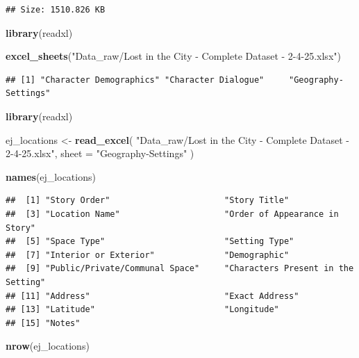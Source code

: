 \documentclass[
]{article}
\newenvironment{Shaded}{\begin{snugshade}}{\end{snugshade}}
\newcommand{\AttributeTok}[1]{\textcolor[rgb]{0.13,0.29,0.53}{#1}}
\newcommand{\FunctionTok}[1]{\textcolor[rgb]{0.13,0.29,0.53}{\textbf{#1}}}
\newcommand{\NormalTok}[1]{#1}
\newcommand{\OtherTok}[1]{\textcolor[rgb]{0.56,0.35,0.01}{#1}}
\newcommand{\StringTok}[1]{\textcolor[rgb]{0.31,0.60,0.02}{#1}}
\begin{document}
\begin{verbatim}
## Size: 1510.826 KB
\end{verbatim}

\begin{Shaded}
\begin{Highlighting}[]
\FunctionTok{library}\NormalTok{(readxl)}

\FunctionTok{excel\_sheets}\NormalTok{(}\StringTok{"Data\_raw/Lost in the City {-} Complete Dataset {-} 2{-}4{-}25.xlsx"}\NormalTok{)}
\end{Highlighting}
\end{Shaded}

\begin{verbatim}
## [1] "Character Demographics" "Character Dialogue"     "Geography-Settings"
\end{verbatim}

\begin{Shaded}
\begin{Highlighting}[]
\FunctionTok{library}\NormalTok{(readxl)}

\NormalTok{ej\_locations }\OtherTok{\textless{}{-}} \FunctionTok{read\_excel}\NormalTok{(}
  \StringTok{"Data\_raw/Lost in the City {-} Complete Dataset {-} 2{-}4{-}25.xlsx"}\NormalTok{,}
  \AttributeTok{sheet =} \StringTok{"Geography{-}Settings"}
\NormalTok{)}

\FunctionTok{names}\NormalTok{(ej\_locations)}
\end{Highlighting}
\end{Shaded}

\begin{verbatim}
##  [1] "Story Order"                       "Story Title"                      
##  [3] "Location Name"                     "Order of Appearance in Story"     
##  [5] "Space Type"                        "Setting Type"                     
##  [7] "Interior or Exterior"              "Demographic"                      
##  [9] "Public/Private/Communal Space"     "Characters Present in the Setting"
## [11] "Address"                           "Exact Address"                    
## [13] "Latitude"                          "Longitude"                        
## [15] "Notes"
\end{verbatim}

\begin{Shaded}
\begin{Highlighting}[]
\FunctionTok{nrow}\NormalTok{(ej\_locations)}
\end{Highlighting}
\end{Shaded}
\end{document}
